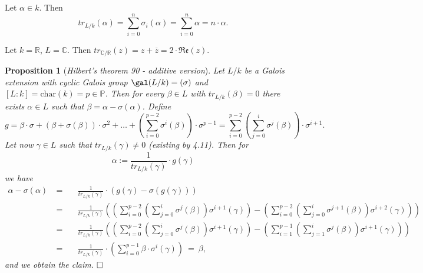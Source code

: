 \documentclass[11pt]{book}
\newtheorem{proposition}[theorem]{Proposition}
\theoremstyle{nonumberbreak}
\newenvironment{pr}[1][]{\ifthenelse{\equal{#1}{}}{\proof}{\proof[#1]}\rm}{\endproof}
\newenvironment{ex}[1][]{\ifthenelse{\equal{#1}{}}{\example}{\example[#1]}\rm}{\endexample}
\begin{document}
\begin{spacing}{1.3}
\begin{ex}
\begin{compactenum}
\item Let $\alpha \in k$. Then
$$tr_{L/k}(\alpha)=\sum_{i=0}^n \sigma_i(\alpha)=\sum_{i=0}^n \alpha = n \cdot \alpha.$$
\item Let $k=\mathbb{R}$, $L=\mathbb{C}$. Then $tr_{\mathbb{C}/\mathbb{R}}(z)=z+\overline{z}= 2 \cdot \mathfrak{Re}(z)$.
\end{compactenum}
\end{ex}



\begin{proposition}[\rm \it Hilbert's theorem 90 - additive version]   %
Let $L/k$ be a Galois extension with cyclic Galois group $\gal(L/k)=( \sigma )$ and $[L:k]=\textrm{char}(k)=p\in\mathbb{P}$.
Then for every $\beta \in L$ with $tr_{L/k}(\beta)=0$ there exists $\alpha \in L$ such that $\beta=\alpha-\sigma(\alpha)$.
\begin{pr}
Define
$$g=\beta \cdot \sigma + \left(\beta+\sigma(\beta)\right)\cdot \sigma^2+ \ldots + \left(\sum_{i=0}^{p-2} \sigma^{i}(\beta)\right) \cdot \sigma^{p-1}=\sum_{i=0}^{p-2} \left(\sum_{j=0}^{i} \sigma^{j}(\beta)\right)\cdot \sigma^{i+1}.$$
Let now $\gamma \in L$ such that $tr_{L/k}(\gamma) \neq 0$ (existing by 4.11). Then for
$$\alpha:=\frac{1}{tr_{L/k}(\gamma)} \cdot g(\gamma)$$
we have
\begin{alignat*}{5}
\alpha-\sigma(\alpha) \ &=&& \ \frac{1}{tr_{L/k}(\gamma)} \cdot \left(g(\gamma)-\sigma\left(g(\gamma)\right)\right) \\
&=&& \ \frac{1}{tr_{L/k}(\gamma)}  \left(\left(\sum_{i=0}^{p-2}\left(\sum_{j=0}^{i} \sigma^{j}(\beta)\right) \sigma^{i+1}(\gamma)\right)- \left(\sum_{i=0}^{p-2}\left(\sum_{j=0}^{i} \sigma^{j+1}(\beta)\right) \sigma^{i+2}(\gamma)\right)\right) \\
&=&& \  \frac{1}{tr_{L/k}(\gamma)}  \left(\left(\sum_{i=0}^{p-2}\left(\sum_{j=0}^{i} \sigma^{j}(\beta)\right) \sigma^{i+1}(\gamma)\right)- \left(\sum_{i=1}^{p-1}\left(\sum_{j=1}^{i} \sigma^{j}(\beta)\right) \sigma^{i+1}(\gamma)\right)\right) \\
&=&& \ \frac{1}{tr_{L/k}(\gamma)} \cdot \left(\sum_{i=0}^{p-1} \beta \cdot \sigma^{i}(\gamma) \right)
\ = \ \beta,
\end{alignat*}
and we obtain the claim. $\hfill \Box$
\end{pr}
\end{proposition}


\end{spacing}
\end{document}
